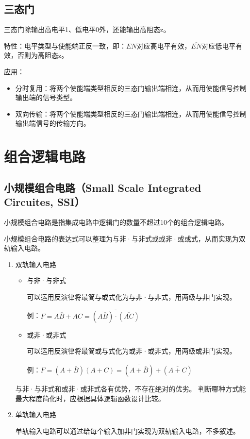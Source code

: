 \documentclass[UTF8,fontset=fandol,zihao=5]{ctexart}
\begin{document}
\subsection{三态门}

三态门除输出高电平1、低电平0外，还能输出高阻态z。

特性：电平类型与使能端正反一致，即：$EN$对应高电平有效，$\overline{EN}$对应低电平有效，否则为高阻态z。

应用：
\begin{itemize}
  \item 分时复用：将两个使能端类型相反的三态门输出端相连，从而用使能信号控制输出端的信号类型。
  \item 双向传输：将两个使能端类型相反的三态门输出端相连，从而用使能信号控制输出端信号的传输方向。
\end{itemize}

\section{组合逻辑电路}

\subsection{小规模组合电路（Small Scale Integrated Circuites, SSI）}

小规模组合电路是指集成电路中逻辑门的数量不超过10个的组合逻辑电路。

小规模组合电路的表达式可以整理为与非·与非式或或非·或或式，从而实现为双轨输入电路。

\begin{enumerate}
  \item 双轨输入电路


\begin{itemize}
  \item 与非·与非式

可以运用反演律将最简与或式化为与非·与非式，用两级与非门实现。

例：$F=A\overline{B}+AC=\overline{(\overline{A\overline{B}})\cdot(\overline{AC})}$

  \item 或非·或非式

可以运用反演律将最简或与式化为或非·或非式，用两级或非门实现。

例：$F=(A+\overline{B})(A+C)=\overline{(\overline{A+\overline{B}})+(\overline{A+C})}$


\end{itemize}

与非·与非式和或非·或非式各有优势，不存在绝对的优劣。
判断哪种方式能最大程度简化时，应根据具体逻辑函数设计比较。

  \item 单轨输入电路

单轨输入电路可以通过给每个输入加非门实现为双轨输入电路，不多叙述。

\end{enumerate}
\end{document}
